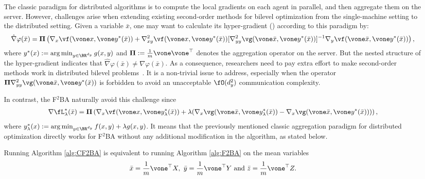 \documentclass{article}
\begin{document}
The classic paradigm for distributed algorithms is to compute the local gradients on each agent in parallel, and then aggregate them on the server. 
However, challenges arise when extending existing second-order methods for bilevel optimization from the single-machine setting to the distributed setting. Given a variable $\bar x$, one may want to calculate its hyper-gradient () according to this paradigm by:
\begin{align*}
    \hat \nabla \varphi(\bar x) = {\bf \Pi} \left( \nabla_x \vf(\vone x, \vone y^*(\bar x)) + \nabla_{xy}^2 \vf(\vone x,\vone y^*(\bar x)) [\nabla_{yy}^2 \vg(\vone \bar x, \vone y^*(\bar x))]^{-1} \nabla_y \vf(\vone \bar x, \vone y^*(\bar x))  \right),
\end{align*}
where $y^*(x) := \arg \min_{y \in \BR^{d_y}} g(x,y)$ and ${\bf \Pi} := \frac{1}{m} \vone \vone^\top$ denotes the aggregation operator on the server. 
But the nested structure of the hyper-gradient indicates that $ \hat \nabla \varphi(\bar x) \ne \nabla \varphi(\bar x)$. As a consequence, 
researchers need to pay extra effort to make second-order methods work in distributed bilevel problems~\citep{tarzanagh2022fednest,chen2022decentralized}.
It is a non-trivial issue to address, especially when the operator $ {\bf \Pi} \nabla_{yy}^2 \vg(\vone \bar x,\vone y^*(\bar x)) $ is forbidden to avoid an unacceptable $\fO(d_y^2)$ communication complexity.

In contrast, the F${}^2$BA naturally avoid this challenge since
\begin{align*}
    \nabla \fL_{\lambda}^*(\bar x) = {\bf \Pi} \left( \nabla_x \vf(\vone x,\vone y_{\lambda}^*(\bar x)) + \lambda (\nabla_x \vg(\vone \bar x, \vone y_{\lambda}^*(\bar x) ) - \nabla_x \vg (\vone \bar x, \vone y^*(\bar x)) ) \right),
\end{align*}
where $y_{\lambda}^*(x) := \arg \min_{y \in \BR^{d_y}} f(x,y) + \lambda g(x,y)$. It means that the previously mentioned classic aggregation paradigm for distributed optimization directly works for F${}^2$BA without any additional modification in the algorithm, as stated below.

\begin{prop} 
Running Algorithm \ref{alg:CF2BA} is equivalent to running  Algorithm \ref{alg:F2BA}  on the mean variables
\begin{align*}
    \bar x = \frac{1}{m} \vone^\top X,~ \bar y = \frac{1}{m} \vone^\top Y ~{\rm and}~ \bar z = \frac{1}{m} \vone^\top Z.
\end{align*}
\end{prop}
\end{document}
